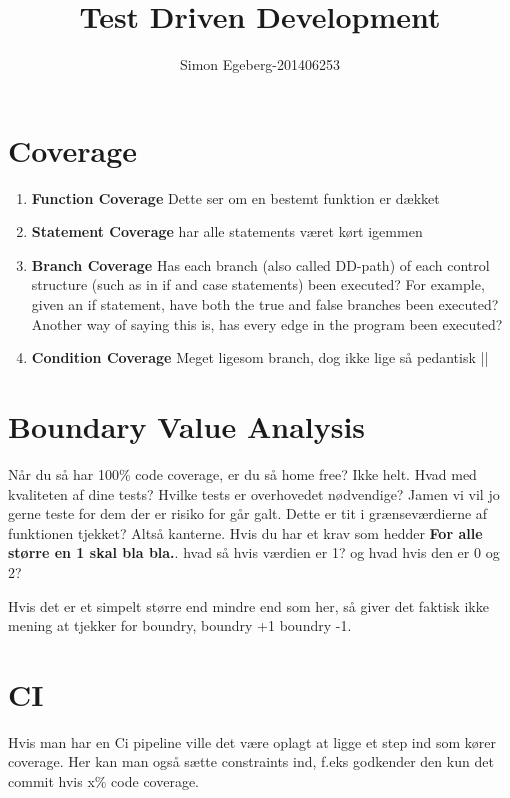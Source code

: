 \documentclass{article}
\title{Test Driven Development}
\author{Simon Egeberg-201406253}
\begin{document}
\maketitle
\section{Coverage}
\begin{enumerate}
	\item \textbf{Function Coverage} Dette ser om en bestemt funktion er dækket
	\item \textbf{Statement Coverage} har alle statements været kørt igemmen
	\item \textbf{Branch Coverage} Has each branch (also called DD-path) of each control structure (such as in if and case statements) been executed? For example, given an if statement, have both the true and false branches been executed? Another way of saying this is, has every edge in the program been executed?
	\item \textbf{Condition Coverage} Meget ligesom branch, dog ikke lige så pedantisk ||
\end{enumerate}
\section{Boundary Value Analysis}
Når du så har 100\% code coverage, er du så home free? Ikke helt. Hvad med kvaliteten af dine tests? Hvilke tests er overhovedet nødvendige? Jamen vi vil jo gerne teste for dem der er risiko for går galt. Dette er tit i grænseværdierne af funktionen tjekket? Altså kanterne. Hvis du har et krav som hedder \textbf{For alle større en 1 skal bla bla.}. hvad så hvis værdien er 1? og hvad hvis den er 0 og 2? 

Hvis det er et simpelt større end mindre end som her, så giver det faktisk ikke mening at tjekker for boundry, boundry +1 boundry -1. 

\section{CI}
Hvis man har en Ci pipeline ville det være oplagt at ligge et step ind som kører coverage. Her kan man også sætte constraints ind, f.eks godkender den kun det commit hvis x\% code coverage.
\end{document}
